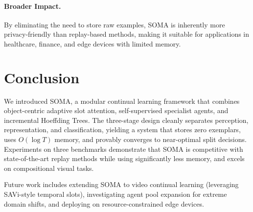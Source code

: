 \documentclass{article}
\begin{document}
\paragraph{Broader Impact.}
By eliminating the need to store raw examples, SOMA is inherently more privacy-friendly than replay-based methods, making it suitable for applications in healthcare, finance, and edge devices with limited memory.


\section{Conclusion}
\label{sec:conclusion}

We introduced SOMA, a modular continual learning framework that combines object-centric adaptive slot attention, self-supervised specialist agents, and incremental Hoeffding Trees. The three-stage design cleanly separates perception, representation, and classification, yielding a system that stores zero exemplars, uses $O(\log T)$ memory, and provably converges to near-optimal split decisions.
Experiments on three benchmarks demonstrate that SOMA is competitive with state-of-the-art replay methods while using significantly less memory, and excels on compositional visual tasks.

Future work includes extending SOMA to video continual learning (leveraging SAVi-style temporal slots), investigating agent pool expansion for extreme domain shifts, and deploying on resource-constrained edge devices.




\end{document}
